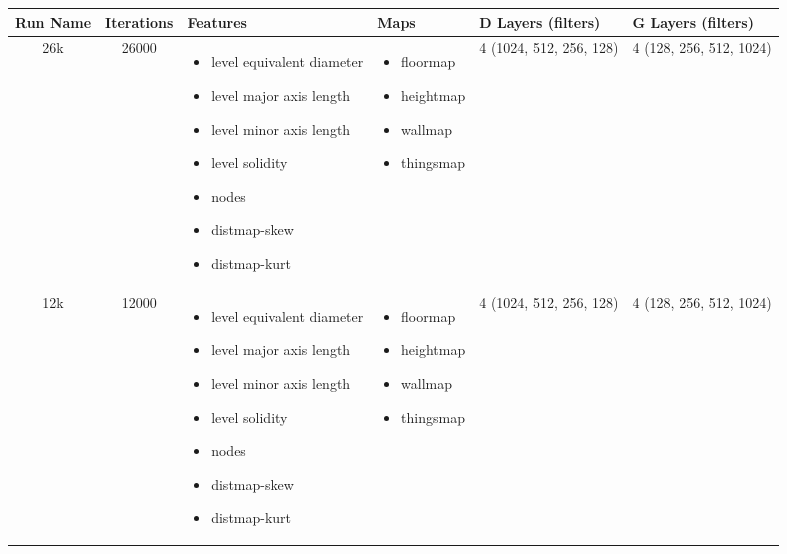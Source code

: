\begin{table}[h!]
	\begin{tabularx}{\textwidth}{| c | c | X | X | X | X |}
		\hline
		\textbf{Run Name} & \textbf{Iterations} & \textbf{Features} & \textbf{Maps} & \textbf{D Layers (filters)} & \textbf{G Layers (filters)} \\
		\hline
		26k & 26000 & 
		\begin{itemize}
			\raggedright
			\small
			\item[] level equivalent diameter
			\item[] level major axis length
			\item[] level minor axis length
			\item[] level solidity
			\item[] nodes
			\item[] distmap-skew
			\item[] distmap-kurt
		\end{itemize}
		 & 
		 	\begin{itemize}
		 	\raggedright
		 	\small
		 	\item[] floormap
		 	\item[] heightmap
		 	\item[] wallmap
		 	\item[] thingsmap
		 \end{itemize}
		 & 4 (1024, 512, 256, 128) & 4 (128, 256, 512, 1024)\\
		
		\hline
		
		12k & 12000 & 
		\begin{itemize}
			\raggedright
			\small
			\item[] level equivalent diameter
			\item[] level major axis length
			\item[] level minor axis length
			\item[] level solidity
			\item[] nodes
			\item[] distmap-skew
			\item[] distmap-kurt
		\end{itemize}
		& 
		\begin{itemize}
			\raggedright
			\small
			\item[] floormap
			\item[] heightmap
			\item[] wallmap
			\item[] thingsmap
		\end{itemize}
		& 4 (1024, 512, 256, 128) & 4 (128, 256, 512, 1024)\\
		

\end{tabularx}
\end{table}
